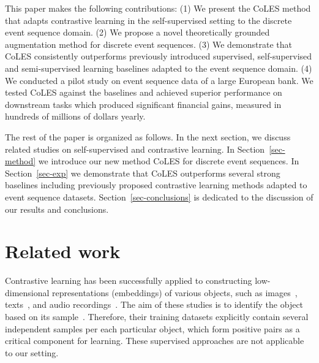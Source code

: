 \documentclass[sigconf]{acmart}
\begin{document}
This paper makes the following contributions: (1) We present the CoLES method that adapts contrastive learning in the self-supervised setting to the discrete event sequence domain. (2) We propose a novel theoretically grounded augmentation method for discrete event sequences. (3) We demonstrate that CoLES consistently outperforms previously introduced supervised, self-supervised and semi-supervised learning baselines adapted to the event sequence domain. (4) We conducted a pilot study on event sequence data 
of a large European bank. We tested CoLES against the baselines and achieved superior performance on downstream tasks which produced significant financial gains, measured in hundreds of millions of dollars yearly.

The rest of the paper is organized as follows. In the next section, we discuss related studies on self-supervised and contrastive learning. In Section~\ref{sec-method} we introduce our new method CoLES for discrete event sequences. In Section~\ref{sec-exp} we demonstrate that CoLES outperforms several strong baselines including previously proposed contrastive learning methods adapted to event sequence datasets. Section~\ref{sec-conclusions} is dedicated to the discussion of our results and conclusions.

\section{Related work} \label{sec-rel-work}

Contrastive learning has been successfully applied to constructing low-dimensional representations (embeddings) of various objects, such as images~\citep{Chopra2005LearningAS, Schroff2015FaceNetAU}, texts~\citep{Reimers2019SentenceBERTSE}, and audio recordings~\citep{Wan2018GeneralizedEL}.
The aim of these studies is to identify the object based on its sample~\citep{Schroff2015FaceNetAU, Hu2014DiscriminativeDM, Wan2018GeneralizedEL}. Therefore, their training datasets explicitly contain several independent samples per each particular object, which form positive pairs as a critical component for learning. These supervised approaches are not applicable to our setting.
\end{document}
